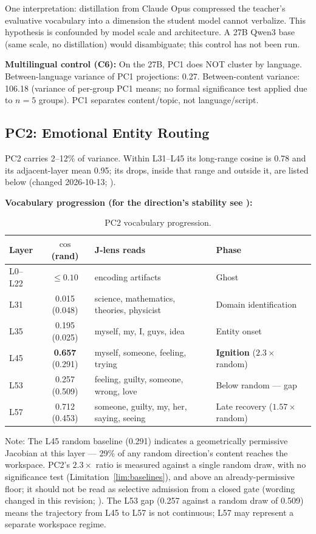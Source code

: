 \documentclass[11pt,a4paper]{article}
\begin{document}
One interpretation: distillation from Claude Opus compressed the teacher's evaluative vocabulary into a dimension the student model cannot verbalize. This hypothesis is confounded by model scale and architecture. A 27B Qwen3 base (same scale, no distillation) would disambiguate; this control has not been run.

\textbf{Multilingual control (C6):} On the 27B, PC1 does NOT cluster by language. Between-language variance of PC1 projections: 0.27. Between-content variance: 106.18 (variance of per-group PC1 means; no formal significance test applied due to $n = 5$ groups). PC1 separates content/topic, not language/script.

\subsection{PC2: Emotional Entity Routing}

PC2 carries 2--12\% of variance. Within L31--L45 its long-range cosine is 0.78 and its adjacent-layer mean 0.95; its drops, inside that range and outside it, are listed below  (changed 2026-10-13; ).

\textbf{Vocabulary progression (for the direction's stability see ):}

\begin{table}[H]
\centering
\caption{PC2 vocabulary progression.}
\label{tab:pc2}
\small
\begin{tabular}{lcp{4.5cm}p{4cm}}
\toprule
Layer & $\cos$ (rand) & J-lens reads & Phase \\
\midrule
L0--L22 & $\leq 0.10$ & encoding artifacts & Ghost \\
L31 & 0.015 (0.048) & science, mathematics, theories, physicist & Domain identification \\
L35 & 0.195 (0.025) & myself, my, I, guys, idea & Entity onset \\
L45 & \textbf{0.657} (0.291) & myself, someone, feeling, trying & \textbf{Ignition} ($2.3\times$ random) \\
L53 & 0.257 (0.509) & feeling, guilty, someone, wrong, love & Below random --- gap \\
L57 & 0.712 (0.453) & someone, guilty, my, her, saying, seeing & Late recovery ($1.57\times$ random) \\
\bottomrule
\end{tabular}
\end{table}

Note: The L45 random baseline (0.291) indicates a geometrically permissive Jacobian at this layer --- 29\% of any random direction's content reaches the workspace. PC2's $2.3\times$ ratio is measured against a single random draw, with no significance test (Limitation~\ref{lim:baselines}), and above an already-permissive floor; it should not be read as selective admission from a closed gate (wording changed in this revision; ). The L53 gap (0.257 against a random draw of 0.509) means the trajectory from L45 to L57 is not continuous; L57 may represent a separate workspace regime.
\end{document}
